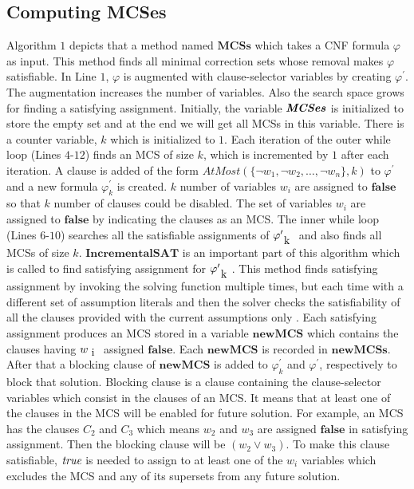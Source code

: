 \subsection{Computing MCSes}
Algorithm $1$ depicts that a method named $\textbf{MCSs}$ which takes a CNF formula $\varphi$ as input. This method finds all minimal correction sets whose removal makes $\varphi$ satisfiable. In Line $1$, $\varphi$ is augmented with clause-selector variables by creating $\varphi^{\prime}$. The augmentation increases the number of variables. Also the search space grows for finding a satisfying assignment. Initially, the variable $\textbf{\textit{MCSes}}$ is initialized to store the empty set and  at the end we will get all MCSs in this variable. There is a counter variable, $k$ which is initialized to $1$.\newline
Each iteration of the outer while loop (Lines $4$-$12$) finds an MCS of size $k$, which is incremented by $1$ after each iteration. A clause is added of the form $AtMost(\{\neg w_{1},\neg w_{2},\ldots,\neg w_{n}\},k)$ to $\varphi^{\prime}$ and a new formula $\varphi^{\prime}_{k}$ is created. $k$ number of variables $w_{i}$ are assigned to $\mathbf{false}$ so that $k$ number of clauses could be disabled. The set of variables $w_{i}$ are assigned to $\mathbf{false}$ by indicating the clauses as an MCS.\newline
The inner while loop (Lines $6$-$10$) searches all the satisfiable assignments of $\varphi^{\prime}_{\text k}$ and also finds all MCSs of size $k$. $\mathbf{IncrementalSAT}$ is an important part of this algorithm which is called to find satisfying assignment for $\varphi^{\prime}_{\text k}$. This method finds satisfying assignment by invoking the solving function multiple times, but each time with a different set of assumption literals and then the solver checks the satisfiability of all the clauses provided with the current assumptions only \cite{nadel}. Each satisfying assignment produces an MCS stored in a variable $\mathbf{newMCS}$ which contains the clauses having $w_{\text i}$ assigned $\mathbf{false}$. Each $\mathbf{newMCS}$ is recorded in $\mathbf{newMCSs}$. After that a blocking clause of $\mathbf{newMCS}$ is added to $\varphi^{\prime}_{k}$ and $\varphi^{\prime}$, respectively to block that solution. Blocking clause is a clause containing the clause-selector variables which consist in the clauses of an MCS. It means that at least one of the clauses in the MCS will be enabled for future solution. For example, an MCS has the clauses $C_{2}$ and $C_{3}$ which means $w_{2}$ and $w_{3}$ are assigned $\mathbf{false}$ in satisfying assignment. Then the blocking clause will be $(w_{2}\vee w_{3})$. To make this clause satisfiable, $\emph{true}$ is needed to assign to at least one of the $w_{i}$ variables which excludes the MCS and any of its supersets from any future solution.\newline
